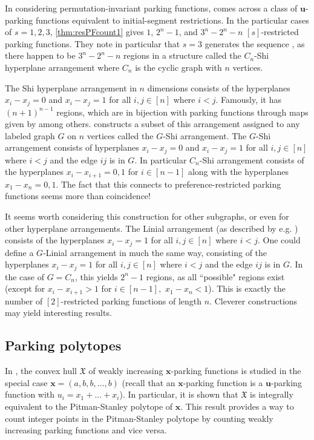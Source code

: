 \documentclass[12 pt]{amsart}
\theoremstyle{definition} %
\theoremstyle{remark} %
\begin{document}
In considering permutation-invariant parking functions, \cite{chen-2023} comes across a class of $\mathbf{u}$-parking functions equivalent to initial-segment restrictions. In the particular cases of $s=1,2,3$, \cref{thm:resPFcount1} gives $1$, $2^n-1$, and $3^n-2^n-n$ $[s]$-restricted parking functions. They note in particular that $s=3$ generates the sequence \cite[A001263]{oeis}, as there happen to be $3^n-2^n-n$ regions in a structure called the $C_{n}$-Shi hyperplane arrangement where $C_{n}$ is the cyclic graph with $n$ vertices.

The Shi hyperplane arrangement in $n$ dimensions consists of the hyperplanes $x_i-x_j=0$ and $x_i-x_j=1$ for all $i,j\in[n]$ where $i<j$. Famously, it has $(n+1)^{n-1}$ regions, which are in bijection with parking functions through maps given by \cite{athanasiadis-linusson-1999} among others. \cite{bennett-2024} constructs a subset of this arrangement assigned to any labeled graph $G$ on $n$ vertices called the $G$-Shi arrangement. The $G$-Shi arrangement consists of hyperplanes $x_i-x_j=0$ and $x_i-x_j=1$ for all $i,j\in[n]$ where $i<j$ and the edge $ij$ is in $G$. In particular $C_n$-Shi arrangement consists of the hyperplanes $x_i-x_{i+1}=0,1$ for $i\in[n-1]$ along with the hyperplanes $x_1-x_n=0,1$. The fact that this connects to preference-restricted parking functions seems more than coincidence!

It seems worth considering this construction for other subgraphs, or even for other hyperplane arrangements. The Linial arrangement (as described by e.g. \cite{stanley-hyperplanes-2007}) consists of the hyperplanes $x_i-x_j=1$ for all $i,j\in[n]$ where $i<j.$ One could define a $G$-Linial arrangement in much the same way, consisting of the hyperplanes $x_i-x_j=1$ for all $i,j\in[n]$ where $i<j$ and the edge $ij$ is in $G$. In the case of $G=C_n$, this yields $2^n-1$ regions, as all ``possible" regions exist (except for $x_i-x_{i+1}>1$ for $i\in[n-1],$ $x_1-x_n<1$). This is exactly the number of $[2]$-restricted parking functions of length $n$. Cleverer constructions may yield interesting results.

\subsection{Parking polytopes}

In \cite{andres-others-2023}, the convex hull $\mathfrak{X}$ of weakly increasing $\mathbf{x}$-parking functions is studied in the special case $\mathbf{x} = (a, b, b, \dots, b)$ (recall that an $\mathbf{x}$-parking function is a $\mathbf{u}$-parking function with $u_{i} = x_{1} + \dots + x_{i}$). In particular, it is shown that $\mathfrak{X}$ is integrally equivalent to the Pitman-Stanley polytope of $\mathbf{x}$. This result provides a way to count integer points in the Pitman-Stanley polytope by counting weakly increasing parking functions and vice versa.
\end{document}
